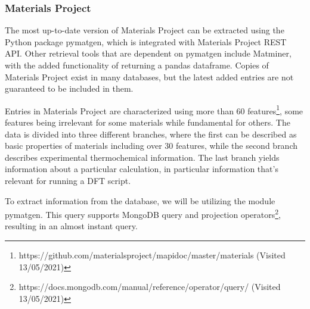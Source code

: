 

\subsubsection{Materials Project}
\label{ssec:materialsproject}

The most up-to-date version of Materials Project can be extracted using the Python package pymatgen, which is integrated with Materials Project REST API. Other retrieval tools that are dependent on pymatgen include Matminer, with the added functionality of returning a pandas dataframe. Copies of Materials Project exist in many databases, but the latest added entries are not guaranteed to be included in them. %

Entries in Materials Project are characterized using more than 60 features\footnote{https://github.com/materialsproject/mapidoc/master/materials (Visited 13/05/2021)}, some features being irrelevant for some materials while fundamental for others. The data is divided into three different branches, where the first can be described as basic properties of materials including over $30$ features, while the second branch describes experimental thermochemical information. The last branch yields information about a particular calculation, in particular information that's relevant for running a DFT script.

To extract information from the database, we will be utilizing the module pymatgen. This query supports MongoDB query and projection operators\footnote{https://docs.mongodb.com/manual/reference/operator/query/ (Visited 13/05/2021)}, resulting in an almost instant query.

